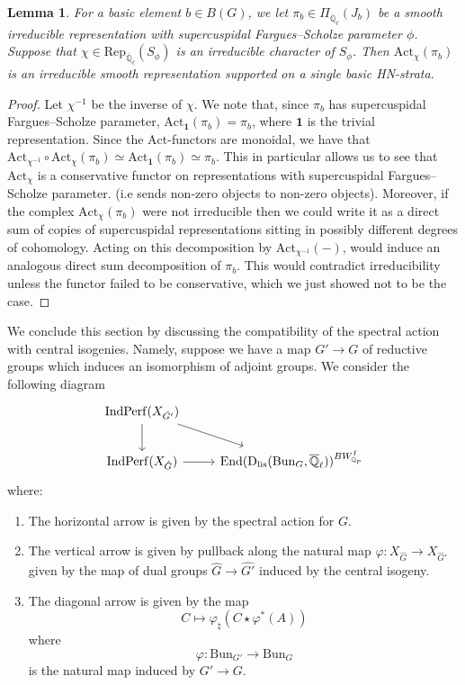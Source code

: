 \documentclass[reqno,11pt]{amsart}
\newtheorem{lemma}[theorem]{Lemma}
\theoremstyle{remark}
\newcommand{\Q}{\mathbb{Q}}
\newcommand{\ov}{\overline}
\newcommand{\Act}{\mathrm{Act}}
\newcommand{\Bun}{\mathrm{Bun}}
\newcommand{\Rep}{\mathrm{Rep}}
\newcommand{\Dlis}{\mathrm{D}_{\mathrm{lis}}}
\newcommand{\IndPerf}{\mathrm{IndPerf}}
\def\ol{\overline}
\def\ra{\rightarrow}
\begin{document}
\begin{lemma}{\label{actirred}}
For a basic element $b \in B(G)$, we let $\pi_{b} \in \Pi_{\ov{\Q}_{\ell}}(J_{b})$ be a smooth irreducible representation with supercuspidal Fargues--Scholze parameter $\phi$. Suppose that $\chi \in \Rep_{\ol{\mathbb{Q}}_{\ell}}(S_{\phi})$ is an irreducible character of $S_{\phi}$.  Then $\Act_{\chi}(\pi_{b})$ is an irreducible smooth representation supported on a single basic HN-strata. 
\end{lemma}
\begin{proof}
Let $\chi^{-1}$ be the inverse of $\chi$. We note that, since $\pi_{b}$ has supercuspidal Fargues--Scholze parameter, $\Act_{\mathbf{1}}(\pi_{b}) = \pi_{b}$, where $\mathbf{1}$ is the trivial representation. Since the $\Act$-functors are monoidal, we have that $\Act_{\chi^{-1}} \circ \Act_{\chi}(\pi_{b}) \simeq \Act_{\mathbf{1}}(\pi_{b}) \simeq \pi_{b}$. This in particular allows us to see that $\Act_{\chi}$ is a conservative functor on representations with supercuspidal Fargues--Scholze parameter. (i.e sends non-zero objects to non-zero objects). Moreover, if the complex $\Act_{\chi}(\pi_{b})$ were not irreducible then we could write it as a direct sum of copies of supercuspidal representations sitting in possibly different degrees of cohomology. Acting on this decomposition by $\Act_{\chi^{-1}}(-)$, would induce an analogous direct sum decomposition of $\pi_{b}$. This would contradict irreducibility unless the functor failed to be conservative, which we just showed not to be the case. 
\end{proof}
We conclude this section by discussing the compatibility of the spectral action with central isogenies. Namely, suppose we have a map $G' \ra G$ of reductive groups which induces an isomorphism of adjoint groups. We consider the following diagram
\begin{equation}
\begin{tikzcd}
\IndPerf(X_{\hat{G'}}) \arrow[dr] \arrow[d] & \\
\IndPerf(X_{\hat{G}}) \arrow[r] &  \mathrm{End}(\Dlis(\Bun_{G},\ol{\mathbb{Q}}_{\ell}))^{BW_{\mathbb{Q}_{p}}^{I}}
\end{tikzcd}    
\end{equation}
where:
\begin{enumerate}
    \item The horizontal arrow is given by the spectral action for $G$.
    \item The vertical arrow is given by pullback along the natural map $\varphi: X_{\hat{G}} \ra X_{\hat{G}'}$ given by the map of dual groups $\hat{G} \ra \hat{G'}$ induced by the central isogeny. 
    \item The diagonal arrow is given by the map
    \[ C \mapsto \varphi_{\natural}(C \star \varphi^{*}(A)) \]
    where
    \[ \varphi: \Bun_{G'} \ra \Bun_{G} \]
    is the natural map induced by $G' \ra G$. 
\end{enumerate}
\end{document}
